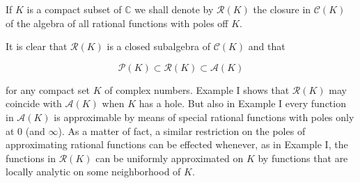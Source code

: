 If $K$ is a compact subset of $\mathbb{C}$ we shall denote by $\mathcal{R}(K)$ the closure in $\mathcal{C}(K)$ of the algebra of all rational functions with poles off $K$.

It is clear that $\mathcal{R}(K)$ is a closed subalgebra of $\mathcal{C}(K)$ and that

$$\mathcal{P}(K) \subset \mathcal{R}(K) \subset \mathcal{A}(K)$$

for any compact set $K$ of complex numbers. Example I shows that $\mathcal{R}(K)$ may coincide with $\mathcal{A}(K)$ when $K$ has a hole. But also in Example I every function in $\mathcal{A}(K)$ is approximable by means of special rational functions with poles only at 0 (and $\infty$). As a matter of fact, a similar restriction on the poles of approximating rational functions can be effected whenever, as in Example I, the functions in $\mathcal{R}(K)$ can be uniformly approximated on $K$ by functions that are locally analytic on some neighborhood of $K$.
